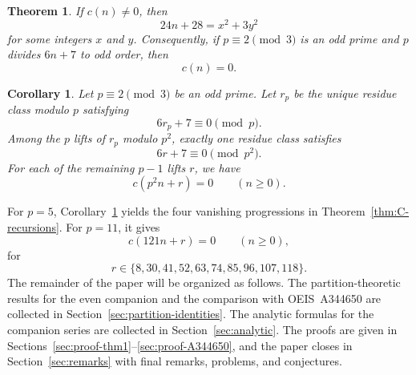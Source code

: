 \documentclass[reqno]{amsart}
\theoremstyle{plain}
\newtheorem{theorem}{Theorem}
\newtheorem{corollary}{Corollary}
\theoremstyle{definition}
\theoremstyle{remark}
\numberwithin{equation}{section}
\begin{document}
\begin{theorem}\label{thm:C-local}
If $c(n)\neq 0$, then
\[
24n+28=x^2+3y^2
\]
for some integers $x$ and $y$. Consequently, if $p\equiv 2\pmod{3}$ is an odd prime and $p$ divides $6n+7$ to odd order, then
\[
c(n)=0.
\]
\end{theorem}

\begin{corollary}\label{cor:C-local-progressions}
Let $p\equiv 2\pmod{3}$ be an odd prime. Let $r_p$ be the unique residue class modulo $p$ satisfying
\[
6r_p+7\equiv 0\pmod{p}.
\]
Among the $p$ lifts of $r_p$ modulo $p^2$, exactly one residue class satisfies
\[
6r+7\equiv 0\pmod{p^2}.
\]
For each of the remaining $p-1$ lifts $r$, we have
\[
c(p^2n+r)=0\qquad(n\ge 0).
\]
\end{corollary}

For $p=5$, Corollary~\ref{cor:C-local-progressions} yields the four vanishing progressions in Theorem~\ref{thm:C-recursions}. For $p=11$, it gives
\[
c(121n+r)=0\qquad(n\ge 0),
\]
for
\[
r\in\{8,30,41,52,63,74,85,96,107,118\}.
\]
The remainder of the paper will be organized as follows. The partition-theoretic results for the even companion and the comparison with OEIS~A344650 are collected in Section~\ref{sec:partition-identities}. The analytic formulas for the companion series are collected in Section~\ref{sec:analytic}. The proofs are given in Sections~\ref{sec:proof-thm1}--\ref{sec:proof-A344650}, and the paper closes in Section~\ref{sec:remarks} with final remarks, problems, and conjectures.
%
\end{document}
